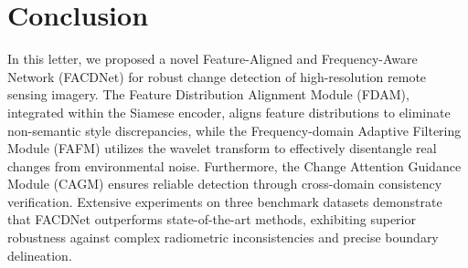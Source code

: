 \documentclass[lettersize,journal]{IEEEtran}
\begin{document}
\section{Conclusion}
In this letter, we proposed a novel Feature-Aligned and Frequency-Aware Network (FACDNet) for robust change detection of high-resolution remote sensing imagery. The Feature Distribution Alignment Module (FDAM), integrated within the Siamese encoder, aligns feature distributions to eliminate non-semantic style discrepancies, while the Frequency-domain Adaptive Filtering Module (FAFM) utilizes the wavelet transform to effectively disentangle real changes from environmental noise. Furthermore, the Change Attention Guidance Module (CAGM) ensures reliable detection through cross-domain consistency verification. Extensive experiments on three benchmark datasets demonstrate that FACDNet outperforms state-of-the-art methods, exhibiting superior robustness against complex radiometric inconsistencies and precise boundary delineation.


\vspace{-10pt}




\end{document}

